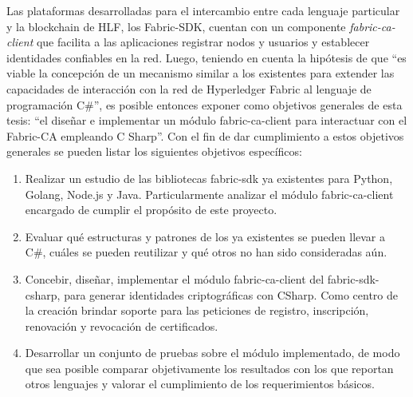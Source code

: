 Las plataformas desarrolladas para el intercambio entre cada lenguaje particular y la blockchain de HLF, los Fabric-SDK, cuentan con un componente \emph{fabric-ca-client} que facilita a las aplicaciones registrar nodos y usuarios y establecer identidades confiables en la red. Luego, teniendo en cuenta la hipótesis de que “es viable la concepci\'on de un mecanismo similar a los existentes para extender las capacidades de interacci\'on con la red de Hyperledger Fabric al lenguaje de programaci\'on C\#”, es posible entonces exponer como objetivos
generales de esta tesis: “el dise\~nar e implementar un m\'odulo fabric-ca-client para interactuar con el Fabric-CA empleando C Sharp”.
Con el fin de dar cumplimiento a estos objetivos generales se pueden listar los siguientes objetivos específicos:

 

\begin{enumerate}
	\item Realizar un estudio de las bibliotecas fabric-sdk ya existentes para Python, Golang, Node.js y Java. Particularmente analizar el m\'odulo fabric-ca-client encargado de cumplir el prop\'osito de este proyecto. 
	
	\item Evaluar qu\'e estructuras y patrones de los ya existentes se pueden llevar a C\#, cu\'ales se pueden reutilizar y qu\'e otros no han sido consideradas a\'un.
	
	\item Concebir, dise\~nar, implementar el m\'odulo fabric-ca-client del fabric-sdk-csharp, para generar identidades criptogr\'aficas con CSharp. Como centro de la creaci\'on brindar soporte para las peticiones de registro, inscripci\'on, renovaci\'on y revocaci\'on de certificados.
	
	
	\item Desarrollar un conjunto de pruebas sobre el m\'odulo implementado, de modo que sea posible comparar objetivamente los resultados con los que reportan otros lenguajes y valorar el cumplimiento de los requerimientos b\'asicos.
\end{enumerate}

